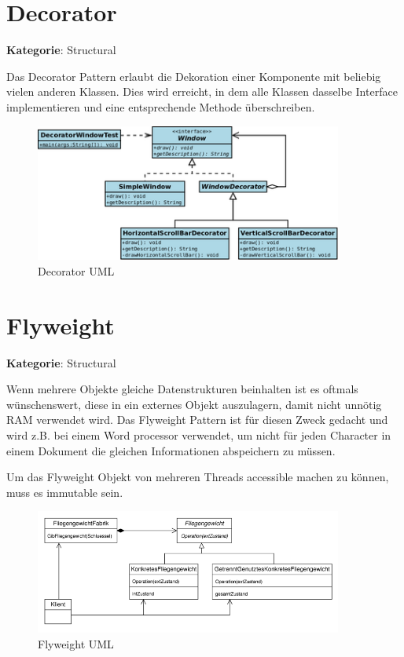 \section{Decorator}
\textbf{Kategorie}: Structural

Das Decorator Pattern erlaubt die Dekoration einer Komponente mit beliebig vielen anderen Klassen. Dies wird erreicht, in dem alle Klassen dasselbe Interface implementieren und eine entsprechende Methode überschreiben.

\begin{figure}[H]
	\centering
	\includegraphics[width=0.9\textwidth]{content/gof/images/08-decorator-example-uml.png}
	\caption{Decorator UML}
\end{figure}


\section{Flyweight}
\textbf{Kategorie}: Structural

Wenn mehrere Objekte gleiche Datenstrukturen beinhalten ist es oftmals wünschenswert, diese in ein externes Objekt auszulagern, damit nicht unnötig RAM verwendet wird. Das Flyweight Pattern ist für diesen Zweck gedacht und wird z.B. bei einem Word processor verwendet, um nicht für jeden Character in einem Dokument die gleichen Informationen abspeichern zu müssen.

Um das Flyweight Objekt von mehreren Threads accessible machen zu können, muss es immutable sein.

\begin{figure}[H]
	\centering
	\includegraphics[width=0.9\textwidth]{content/gof/images/09-flyweight-uml.png}
	\caption{Flyweight UML}
\end{figure}


